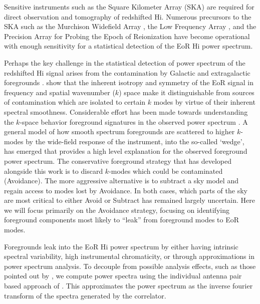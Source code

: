 \documentclass[preprint2,iop,numberedappendix]{emulateapj}
\begin{document}
Sensitive instruments such as the Square Kilometer Array (SKA) are required for direct observation and tomography of redshifted H{\sc i}. Numerous precursors to the SKA such as the Murchison Widefield Array \citep[MWA;][]{lon09,tin13}, the Low Frequency Array \citep[LOFAR;][]{van13}, and the Precision Array for Probing the Epoch of Reionization \citep[PAPER;][]{par10} have become operational with enough sensitivity for a statistical detection of the EoR H{\sc i} power spectrum. 

Perhaps the key challenge in the statistical detection of power spectrum of the redshifted H{\sc i} signal arises from the contamination by Galactic and extragalactic foregrounds \citep[see, e.g.,][]{dim02,zal04,fur06}. \citet{mor04} show that the inherent isotropy and symmetry of the EoR signal in frequency and spatial wavenumber ($k$) space make it distinguishable from sources of contamination which are isolated to certain $k$ modes by virtue of their inherent spectral smoothness\citep{mor06,bow09,liu11,par12,dil13}. Considerable effort has been made towards understanding the $k$-space behavior foreground signatures in the observed power spectrum \citep{thy13,pob13,mor12,tro12,dat10,bow09}. A general model of how smooth spectrum foregrounds are scattered to higher $k$-modes by the wide-field response of the instrument, into the so-called `wedge', has emerged that provides a high level explanation for the observed foreground power spectrum. The conservative foreground strategy that has developed alongside this work is to discard $k$-modes which could be contaminated (Avoidance). The more aggressive alternative is to subtract a sky model and regain access to modes lost by Avoidance. In both cases, which parts of the sky are most critical to either Avoid or Subtract has remained largely uncertain. Here we will focus primarily on the Avoidance strategy, focusing on identifying foreground components most likely to ``leak'' from foreground modes to EoR modes.

Foregrounds leak into the EoR H{\sc i} power spectrum by either having intrinsic spectral variability, high instrumental chromaticity, or through approximations in power spectrum analysis. 
To decouple from possible analysis effects, such as those pointed out by \citet{haz13}, we compute power spectra using the individual antenna pair based approach of \citet{pob13,par14}.  This approximates the power spectrum as the inverse fourier transform of the spectra generated by the correlator. 
\end{document}
